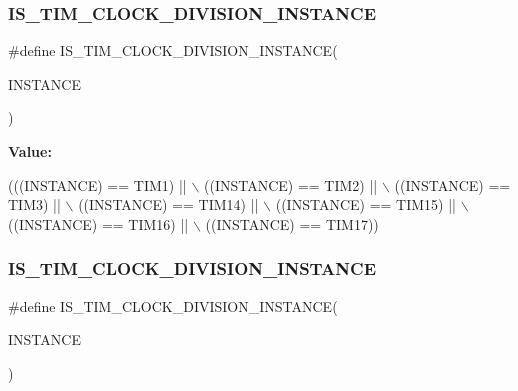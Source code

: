 \subsubsection{\texorpdfstring{I\+S\+\_\+\+T\+I\+M\+\_\+\+C\+L\+O\+C\+K\+\_\+\+D\+I\+V\+I\+S\+I\+O\+N\+\_\+\+I\+N\+S\+T\+A\+N\+CE}{IS\_TIM\_CLOCK\_DIVISION\_INSTANCE}\hspace{0.1cm}{\footnotesize\ttfamily [14/16]}}
{\footnotesize\ttfamily \#define I\+S\+\_\+\+T\+I\+M\+\_\+\+C\+L\+O\+C\+K\+\_\+\+D\+I\+V\+I\+S\+I\+O\+N\+\_\+\+I\+N\+S\+T\+A\+N\+CE(\begin{DoxyParamCaption}\item[{}]{I\+N\+S\+T\+A\+N\+CE }\end{DoxyParamCaption})}

{\bfseries Value\+:}
\begin{DoxyCode}
(((INSTANCE) == TIM1)    || \(\backslash\)
   ((INSTANCE) == TIM2)    || \(\backslash\)
   ((INSTANCE) == TIM3)    || \(\backslash\)
   ((INSTANCE) == TIM14)   || \(\backslash\)
   ((INSTANCE) == TIM15)   || \(\backslash\)
   ((INSTANCE) == TIM16)   || \(\backslash\)
   ((INSTANCE) == TIM17))
\end{DoxyCode}
\mbox{\label{group___exported__macro_gac54b9f42e8ab07c41abe7d96d13d698a}} 
\subsubsection{\texorpdfstring{I\+S\+\_\+\+T\+I\+M\+\_\+\+C\+L\+O\+C\+K\+\_\+\+D\+I\+V\+I\+S\+I\+O\+N\+\_\+\+I\+N\+S\+T\+A\+N\+CE}{IS\_TIM\_CLOCK\_DIVISION\_INSTANCE}\hspace{0.1cm}{\footnotesize\ttfamily [15/16]}}
{\footnotesize\ttfamily \#define I\+S\+\_\+\+T\+I\+M\+\_\+\+C\+L\+O\+C\+K\+\_\+\+D\+I\+V\+I\+S\+I\+O\+N\+\_\+\+I\+N\+S\+T\+A\+N\+CE(\begin{DoxyParamCaption}\item[{}]{I\+N\+S\+T\+A\+N\+CE }\end{DoxyParamCaption})}

